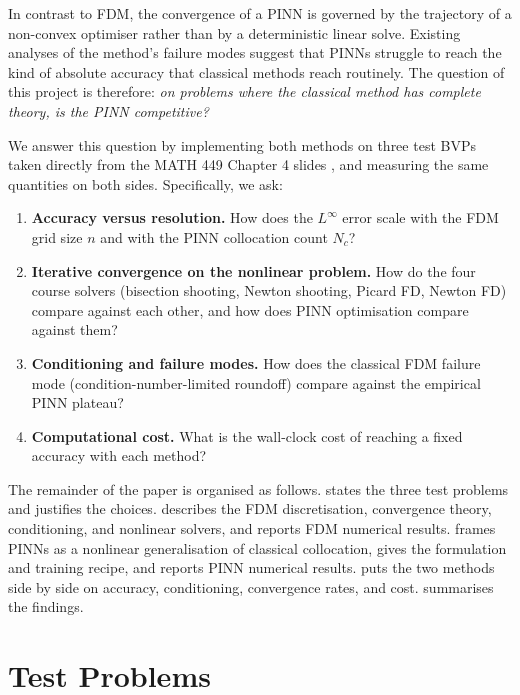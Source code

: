 \documentclass[11pt]{article}
\theoremstyle{plain}
\theoremstyle{remark}
\newcommand{\Linf}{L^\infty}
\begin{document}
In contrast to FDM, the convergence of a PINN is governed by the
trajectory of a non-convex optimiser rather than by a deterministic linear
solve. Existing analyses of the method's failure modes
\citep{wang2022,rahaman2019} suggest that PINNs struggle to reach the kind
of absolute accuracy that classical methods reach routinely. The question
of this project is therefore: \textit{on problems where the classical method
has complete theory, is the PINN competitive?}

We answer this question by implementing both methods on three test BVPs
taken directly from the MATH 449 Chapter 4 slides \citep{khouider2026bvp},
and measuring the same quantities on both sides. Specifically, we ask:

\begin{enumerate}
\item \textbf{Accuracy versus resolution.} How does the $\Linf$ error scale
      with the FDM grid size $n$ and with the PINN collocation count $N_c$?
\item \textbf{Iterative convergence on the nonlinear problem.} How do the
      four course solvers (bisection shooting, Newton shooting, Picard FD,
      Newton FD) compare against each other, and how does PINN optimisation
      compare against them?
\item \textbf{Conditioning and failure modes.} How does the classical
      FDM failure mode (condition-number-limited roundoff) compare against
      the empirical PINN plateau?
\item \textbf{Computational cost.} What is the wall-clock cost of reaching
      a fixed accuracy with each method?
\end{enumerate}

The remainder of the paper is organised as follows.
 states the three test problems and justifies the choices.
 describes the FDM discretisation, convergence theory,
conditioning, and nonlinear solvers, and reports FDM numerical results.
 frames PINNs as a nonlinear generalisation of classical
collocation, gives the formulation and training recipe, and reports PINN
numerical results.  puts the two methods side by side
on accuracy, conditioning, convergence rates, and cost.
 summarises the findings.


\section{Test Problems}
\label{sec:problems}
\end{document}
